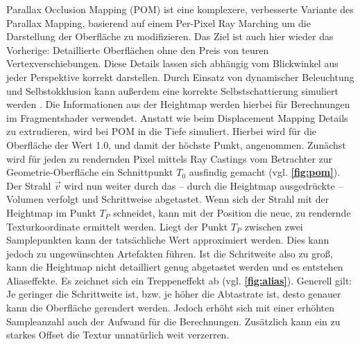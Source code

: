 Parallax Occlusion Mapping (POM) ist eine komplexere, verbesserte Variante des Parallax Mapping, basierend auf einem Per-Pixel Ray Marching um die 
Darstellung der Oberfläche zu modifizieren.
Das Ziel ist auch hier wieder das Vorherige: Detaillierte Oberflächen ohne den Preis von teuren Vertexverschiebungen.
Diese Details lassen sich abhängig vom Blickwinkel aus jeder Perspektive korrekt darstellen.
Durch Einsatz von dynamischer Beleuchtung und Selbstokklusion kann außerdem eine korrekte Selbstschattierung simuliert werden \parencite{Brawley2004, Tatarchuk2006}.
Die Informationen aus der Heightmap werden hierbei für Berechnungen im Fragmentshader verwendet.
Anstatt wie beim Displacement Mapping Details zu extrudieren, wird bei POM in die Tiefe simuliert.
Hierbei wird für die Oberfläche der Wert 1.0, und damit der höchste Punkt, angenommen.
Zunächst wird für jeden zu rendernden Pixel mittels Ray Castings vom Betrachter zur Geometrie-Oberfläche ein Schnittpunkt  $T_0$ ausfindig gemacht 
(vgl. \textbf{\autoref{fig:pom}}).
Der Strahl $\vec{v}$ wird nun weiter durch das – durch die Heightmap ausgedrückte – Volumen verfolgt und Schrittweise abgetastet. Wenn sich der Strahl 
mit der Heightmap im Punkt $T_P$ schneidet, kann mit der Position die neue, zu rendernde Texturkoordinate ermittelt werden. Liegt der Punkt $T_P$ zwischen 
zwei Samplepunkten kann der tatsächliche Wert approximiert werden. Dies kann jedoch zu ungewünschten Artefakten führen.
Ist die Schritweite also zu groß, kann die Heightmap nicht detailliert genug abgetastet werden und es entstehen Aliaseffekte. Es zeichnet sich
ein Treppeneffekt ab (vgl. \textbf{\autoref{fig:alias}}). Generell gilt: Je geringer die Schrittweite ist, bzw. je höher die Abtastrate ist, 
desto genauer kann die Oberfläche gerendert werden. Jedoch erhöht sich mit einer erhöhten Sampleanzahl auch der Aufwand für die Berechnungen.
Zusätzlich kann ein zu starkes Offset die Textur unnatürlich weit verzerren. 


